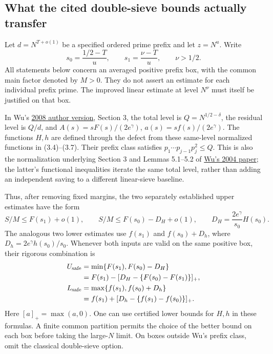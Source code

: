 
\subsection{What the cited double-sieve bounds actually transfer}
\label{sec:external-chen-input-resolution}

Let $d=N^{T+o(1)}$ be a specified ordered prime prefix and let
$z=N^u$. Write
\[
 s_0=\frac{1/2-T}{u},\qquad s_1=\frac{\nu-T}{u},
 \qquad \nu>1/2.
\]
All statements below concern an averaged positive prefix box,
with the common main factor denoted by $M>0$. They do not assert
an estimate for each individual prefix prime.
The improved linear estimate at level $N^\nu$ must itself be
justified on that box.

In Wu's \href{https://arxiv.org/pdf/0709.3764}{2008 author version},
Section 3, the total level is $Q=N^{1/2-\delta}$, the residual
level is $Q/d$, and $A(s)=sF(s)/(2e^\gamma)$,
$a(s)=sf(s)/(2e^\gamma)$.
The functions $H,h$ are defined through the defect from these
same-level normalized functions in (3.4)--(3.7).
Their prefix class satisfies
$p_1\cdots p_{j-1}p_j^2\le Q$.
This is also the normalization underlying Section 3 and Lemmas
5.1--5.2 of
\href{https://www.impan.pl/shop/en/publication/transaction/download/product/82961}
{Wu's 2004 paper}; the latter's functional inequalities iterate
the same total level, rather than adding an independent saving
to a different linear-sieve baseline.

Thus, after removing fixed margins, the two separately established
upper estimates have the form
\[
 S/M\le F(s_1)+o(1),\qquad
 S/M\le F(s_0)-D_H+o(1),\qquad
 D_H=\frac{2e^\gamma}{s_0}H(s_0).
\]
The analogous two lower estimates use $f(s_1)$ and
$f(s_0)+D_h$, where $D_h=2e^\gamma h(s_0)/s_0$.
Whenever both inputs are valid on the same positive box, their
rigorous combination is
\begin{align}
 U_{\rm safe}
 &=\min\{F(s_1),F(s_0)-D_H\}\notag\\
 &=F(s_1)-[D_H-\{F(s_0)-F(s_1)\}]_+,
 \label{eq:external-safe-upper}\\
 L_{\rm safe}
 &=\max\{f(s_1),f(s_0)+D_h\}\notag\\
 &=f(s_1)+[D_h-\{f(s_1)-f(s_0)\}]_+.
 \label{eq:external-safe-lower}
\end{align}
Here $[a]_+=\max(a,0)$. One can use certified lower bounds for
$H,h$ in these formulas. A finite common partition permits the
choice of the better bound on each box before taking the
large-$N$ limit. On boxes outside Wu's prefix class, omit the
classical double-sieve option.

